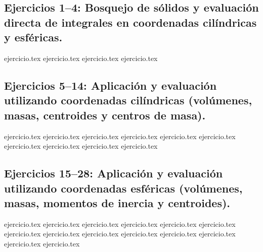 
\subsection*{Ejercicios 1--4: Bosquejo de sólidos y evaluación directa de integrales en coordenadas cilíndricas y esféricas.}
\begin{enumerate}
    {ejercicio.tex}
    {ejercicio.tex}
    {ejercicio.tex}
    {ejercicio.tex}
\end{enumerate}

\subsection*{Ejercicios 5--14: Aplicación y evaluación utilizando coordenadas cilíndricas (volúmenes, masas, centroides y centros de masa).}
\begin{enumerate}
    \setcounter{enumi}{4}
    {ejercicio.tex}
    {ejercicio.tex}
    {ejercicio.tex}
    {ejercicio.tex}
    {ejercicio.tex}
    {ejercicio.tex}
    {ejercicio.tex}
    {ejercicio.tex}
    {ejercicio.tex}
    {ejercicio.tex}
\end{enumerate}

\subsection*{Ejercicios 15--28: Aplicación y evaluación utilizando coordenadas esféricas (volúmenes, masas, momentos de inercia y centroides).}
\begin{enumerate}
    \setcounter{enumi}{14}
    {ejercicio.tex}
    {ejercicio.tex}
    {ejercicio.tex}
    {ejercicio.tex}
    {ejercicio.tex}
    {ejercicio.tex}
    {ejercicio.tex}
    {ejercicio.tex}
    {ejercicio.tex}
    {ejercicio.tex}
    {ejercicio.tex}
    {ejercicio.tex}
    {ejercicio.tex}
    {ejercicio.tex}
\end{enumerate}

